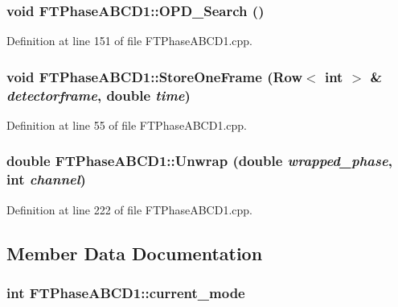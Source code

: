 \hypertarget{classFTPhaseABCD1_a16dbd37c05bd96bebab3a22d8e98fd5d}{
\subsubsection[{OPD\_\-Search}]{\setlength{\rightskip}{0pt plus 5cm}void FTPhaseABCD1::OPD\_\-Search ()}}
\label{classFTPhaseABCD1_a16dbd37c05bd96bebab3a22d8e98fd5d}


Definition at line 151 of file FTPhaseABCD1.cpp.

\hypertarget{classFTPhaseABCD1_a3af0de42c400aeed38d77b2edf0e77e7}{
\subsubsection[{StoreOneFrame}]{\setlength{\rightskip}{0pt plus 5cm}void FTPhaseABCD1::StoreOneFrame ({\bf Row}$<$ int $>$ \& {\em detectorframe}, \/  double {\em time})}}
\label{classFTPhaseABCD1_a3af0de42c400aeed38d77b2edf0e77e7}


Definition at line 55 of file FTPhaseABCD1.cpp.

\hypertarget{classFTPhaseABCD1_ad0d37735d29375d33bf1f9e5f349a706}{
\subsubsection[{Unwrap}]{\setlength{\rightskip}{0pt plus 5cm}double FTPhaseABCD1::Unwrap (double {\em wrapped\_\-phase}, \/  int {\em channel})}}
\label{classFTPhaseABCD1_ad0d37735d29375d33bf1f9e5f349a706}


Definition at line 222 of file FTPhaseABCD1.cpp.



\subsection{Member Data Documentation}
\hypertarget{classFTPhaseABCD1_aaec9fb5aee6e1d1e188fe7f1fffbe7d4}{
\subsubsection[{current\_\-mode}]{\setlength{\rightskip}{0pt plus 5cm}int {\bf FTPhaseABCD1::current\_\-mode}}}
\label{classFTPhaseABCD1_aaec9fb5aee6e1d1e188fe7f1fffbe7d4}


